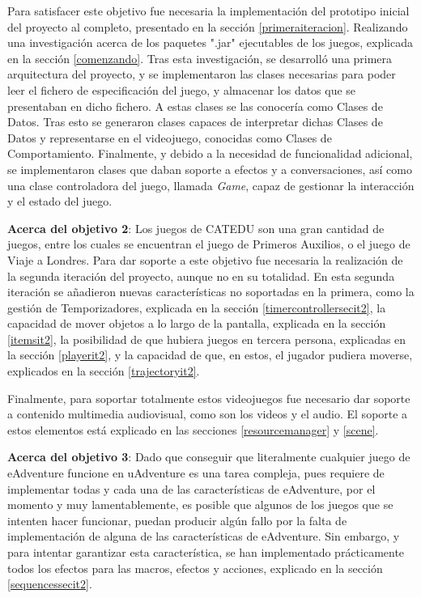Para satisfacer este objetivo fue necesaria la implementación del prototipo inicial del proyecto al completo, presentado en la sección \ref{primeraiteracion}. Realizando una investigación acerca de los paquetes ".jar" ejecutables de los juegos, explicada en la sección \ref{comenzando}. Tras esta investigación, se desarrolló una primera arquitectura del proyecto, y se implementaron las clases necesarias para poder leer el fichero de especificación del juego, y almacenar los datos que se presentaban en dicho fichero. A estas clases se las conocería como Clases de Datos. Tras esto se generaron clases capaces de interpretar dichas Clases de Datos y representarse en el videojuego, conocidas como Clases de Comportamiento. Finalmente, y debido a la necesidad de funcionalidad adicional, se implementaron clases que daban soporte a efectos y a conversaciones, así como una clase controladora del juego, llamada \textit{Game}, capaz de gestionar la interacción y el estado del juego.

\textbf{Acerca del objetivo 2}: Los juegos de CATEDU son una gran cantidad de juegos, entre los cuales se encuentran el juego de Primeros Auxilios, o el juego de Viaje a Londres. Para dar soporte a este objetivo fue necesaria la realización de la segunda iteración del proyecto, aunque no en su totalidad. En esta segunda iteración se añadieron nuevas características no soportadas en la primera, como la gestión de Temporizadores, explicada en la sección \ref{timercontrollersecit2}, la capacidad de mover objetos a lo largo de la pantalla, explicada en la sección \ref{itemsit2}, la posibilidad de que hubiera juegos en tercera persona, explicadas en la sección \ref{playerit2}, y la capacidad de que, en estos, el jugador pudiera moverse, explicados en la sección \ref{trajectoryit2}.

Finalmente, para soportar totalmente estos videojuegos fue necesario dar soporte a contenido multimedia audiovisual, como son los videos y el audio. El soporte a estos elementos está explicado en las secciones \ref{resourcemanager} y \ref{scene}.

\textbf{Acerca del objetivo 3}: Dado que conseguir que literalmente cualquier juego de eAdventure funcione en uAdventure es una tarea compleja, pues requiere de implementar todas y cada una de las características de eAdventure, por el momento y muy lamentablemente, es posible que algunos de los juegos que se intenten hacer funcionar, puedan producir algún fallo por la falta de implementación de alguna de las características de eAdventure. Sin embargo, y para intentar garantizar esta característica, se han implementado prácticamente todos los efectos para las macros, efectos y acciones, explicado en la sección \ref{sequencessecit2}.

